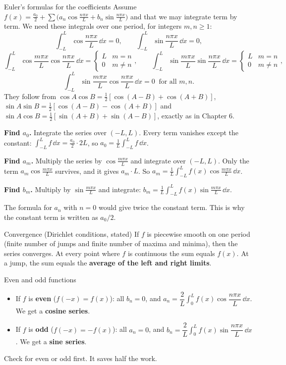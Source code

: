 \begin{derivbox}{Euler's formulas for the coefficients}
Assume $f(x) = \frac{a_0}{2} + \sum\big(a_n\cos\frac{n\pi x}{L} + b_n\sin\frac{n\pi x}{L}\big)$ and that we may integrate term by term. We need these integrals over one period, for integers $m,n\ge1$:
\[ \int_{-L}^{L}\cos\frac{n\pi x}{L}\,\dd x = 0,\qquad \int_{-L}^{L}\sin\frac{n\pi x}{L}\,\dd x = 0, \]
\[ \int_{-L}^{L}\cos\frac{m\pi x}{L}\cos\frac{n\pi x}{L}\,\dd x = \begin{cases}L & m=n\\0 & m\ne n\end{cases},\qquad \int_{-L}^{L}\sin\frac{m\pi x}{L}\sin\frac{n\pi x}{L}\,\dd x = \begin{cases}L & m=n\\0 & m\ne n\end{cases}, \]
\[ \int_{-L}^{L}\sin\frac{m\pi x}{L}\cos\frac{n\pi x}{L}\,\dd x = 0\ \text{ for all } m,n. \]
They follow from $\cos A\cos B = \frac12[\cos(A-B)+\cos(A+B)]$, $\sin A\sin B = \frac12[\cos(A-B)-\cos(A+B)]$ and $\sin A\cos B = \frac12[\sin(A+B)+\sin(A-B)]$, exactly as in Chapter 6.

\textbf{Find $a_0$.} Integrate the series over $(-L,L)$. Every term vanishes except the constant: $\int_{-L}^{L}f\,\dd x = \frac{a_0}{2}\cdot2L$, so $a_0 = \frac1L\int_{-L}^{L}f\,\dd x$.

\textbf{Find $a_m$.} Multiply the series by $\cos\frac{m\pi x}{L}$ and integrate over $(-L,L)$. Only the term $a_m\cos\frac{m\pi x}{L}$ survives, and it gives $a_m\cdot L$. So $a_m = \frac1L\int_{-L}^{L}f(x)\cos\frac{m\pi x}{L}\,\dd x$.

\textbf{Find $b_m$.} Multiply by $\sin\frac{m\pi x}{L}$ and integrate: $b_m = \frac1L\int_{-L}^{L}f(x)\sin\frac{m\pi x}{L}\,\dd x$.

The formula for $a_n$ with $n=0$ would give twice the constant term. This is why the constant term is written as $a_0/2$.
\end{derivbox}

\begin{defbox}{Convergence (Dirichlet conditions, stated)}
If $f$ is piecewise smooth on one period (finite number of jumps and finite number of maxima and minima), then the series converges. At every point where $f$ is continuous the sum equals $f(x)$. At a jump, the sum equals the \textbf{average of the left and right limits}.
\end{defbox}

\begin{defbox}{Even and odd functions}
\begin{itemize}
  \item If $f$ is \textbf{even} ($f(-x)=f(x)$): all $b_n = 0$, and $a_n = \dfrac2L\displaystyle\int_0^L f(x)\cos\dfrac{n\pi x}{L}\,\dd x$. We get a \textbf{cosine series}.
  \item If $f$ is \textbf{odd} ($f(-x)=-f(x)$): all $a_n=0$, and $b_n = \dfrac2L\displaystyle\int_0^L f(x)\sin\dfrac{n\pi x}{L}\,\dd x$. We get a \textbf{sine series}.
\end{itemize}
Check for even or odd first. It saves half the work.
\end{defbox}

